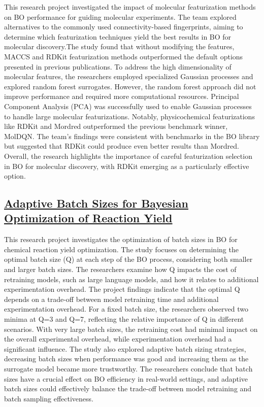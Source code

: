 This research project investigated the impact of molecular featurization methods on BO performance for guiding molecular experiments. The team explored alternatives to the commonly used connectivity-based fingerprints, aiming to determine which featurization techniques yield the best results in BO for molecular discovery.The study found that without modifying the features, MACCS\cite{durant2002reoptimization} and RDKit\cite{landrum2013rdkit} featurization methods outperformed the default options presented in previous publications. To address the high dimensionality of molecular features, the researchers employed specialized Gaussian processes and explored random forest surrogates. However, the random forest approach did not improve performance and required more computational resources. Principal Component Analysis (PCA) was successfully used to enable Gaussian processes to handle large molecular featurizations. Notably, physicochemical featurizations like RDKit and Mordred\cite{moriwaki2018mordred} outperformed the previous benchmark winner, MolDQN\cite{zhou2019optimization}. The team's findings were consistent with benchmarks in the BO library but suggested that RDKit could produce even better results than Mordred. Overall, the research highlights the importance of careful featurization selection in BO for molecular discovery, with RDKit emerging as a particularly effective option.
 \subsection*{\href{https://www.youtube.com/watch?v=utnWbJsObF0}{Adaptive Batch Sizes for Bayesian Optimization of Reaction Yield}}

This research project investigates the optimization of batch sizes in BO for chemical reaction yield optimization. The study focuses on determining the optimal batch size (Q) at each step of the BO process, considering both smaller and larger batch sizes. The researchers examine how Q impacts the cost of retraining models, such as large language models, and how it relates to additional experimentation overhead. The project findings indicate that the optimal Q depends on a trade-off between model retraining time and additional experimentation overhead. For a fixed batch size, the researchers observed two minima at Q=3 and Q=7, reflecting the relative importance of Q in different scenarios. With very large batch sizes, the retraining cost had minimal impact on the overall experimental overhead, while experimentation overhead had a significant influence. The study also explored adaptive batch sizing strategies, decreasing batch sizes when performance was good and increasing them as the surrogate model became more trustworthy. The researchers conclude that batch sizes have a crucial effect on BO efficiency in real-world settings, and adaptive batch sizes could effectively balance the trade-off between model retraining and batch sampling effectiveness.
